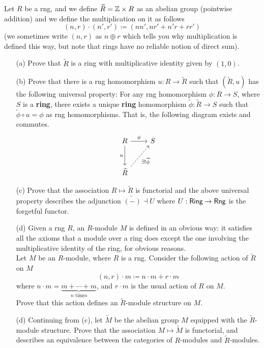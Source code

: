 \vspace{0.1in}

\begin{problem}\label{prob 8.2}
Let $R$ be a rng, and we define $\widetilde{R} = \mathbb Z \times R$ as an abelian group (pointwise addition) and we define the multiplication on it as follows
\[(n,r)\cdot (n',r') \coloneqq (nn',nr' + n'r + rr')\]
(we sometimes write $(n,r)$ as $n\oplus r$ which tells you why multiplication is defined this way, but note that rings have no reliable notion of direct sum).
\begin{itemize}
\item[(a)] Prove that $\widetilde{R}$ is a ring with multiplicative identity given by $(1,0)$.
\item[(b)] Prove that there is a rng homomorphism $u:R \to \widetilde{R}$ such that $(\widetilde{R},u)$ has the following universal property: For any rng homomorphism $\phi:R \to S$, where $S$ is a \textbf{ring}, there exists a unique \textbf{ring} homomorphism $\widetilde{\phi}:\widetilde{R} \to S$ such that
$\widetilde{\phi}\circ u = \phi$ as rng homomorphisms. That is, the following diagram exists and commutes.
\[\begin{tikzcd}
R \arrow[r, "\phi"] \arrow[d, "u"']                           & S \\[1em]
\widetilde{R} \arrow[ru, "\exists!\widetilde{\phi}"', dashed] &  
\end{tikzcd}\]
\item[(c)] Prove that the association $R \mapsto \widetilde{R}$ is functorial and the above universal property describes the adjunction $\widetilde{(-)}\dashv U$ where $U:\mathsf{Ring} \to \mathsf{Rng}$ is the forgetful functor. 
\item[(d)] Given a rng $R$, an $R$-module $M$ is defined in an obvious way: it satisfies all the axioms that a module over a ring does except the one involving the multiplicative identity of the ring, for obvious reasons.\\[1em]
Let $M$ be an $R$-module, where $R$ is a rng. Consider the following action of $\widetilde{R}$ on $M$
\[(n,r)\cdot m \coloneqq n\cdot m + r\cdot m\]
where $n\cdot m = \underbrace{m+ \cdots + m}_{\text{$n$ times}}$, and $r\cdot m$ is the usual action of $R$ on $M$.\\[0.5em]
Prove that this action defines an $\widetilde{R}$-module structure on $M$. 
\item[(d)] Continuing from (c), let $\widetilde{M}$ be the abelian group $M$ equipped with the $\widetilde{R}$-module structure. Prove that the association $M \mapsto \widetilde{M}$ is functorial, and describes an equivalence between the categories of $R$-modules and $\widetilde{R}$-modules.
\end{itemize}
\end{problem}

